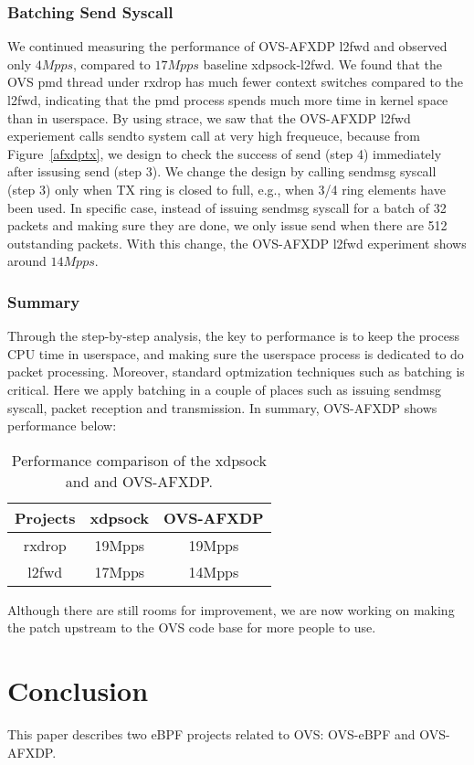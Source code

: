 \documentclass[10pt]{sigplanconf}
\begin{document}
\subsubsection{Batching Send Syscall}
We continued measuring the performance of OVS-AFXDP l2fwd and
observed only $4Mpps$, compared to $17Mpps$ baseline xdpsock-l2fwd.
We found that the OVS pmd thread under rxdrop
has much fewer context switches compared to the l2fwd, indicating that
the pmd process spends much more time in kernel space than in userspace.
By using strace, we saw that the OVS-AFXDP l2fwd experiement calls sendto system call
at very high frequeuce, because from Figure~\ref{afxdptx}, we design to check
the success of send (step 4) immediately after issusing send (step 3).
We change the design by calling sendmsg syscall (step 3) only when TX ring is
closed to full, e.g., when 3/4 ring elements have been used.
In specific case, instead of issuing sendmsg syscall for a batch of 32 packets
and making sure they are done, we only issue send when there are 512 outstanding
packets.  With this change, the OVS-AFXDP l2fwd experiment shows around $14Mpps$.

\subsubsection{Summary}
Through the step-by-step analysis, the key to performance is to keep
the process CPU time in userspace, and making sure the userspace process
is dedicated to do packet processing. Moreover, standard optmization
techniques such as batching is critical. Here we apply batching in a
couple of places such as issuing sendmsg syscall, packet reception and
transmission. In summary, OVS-AFXDP shows performance below:
\begin{table}
\centering
\small
\begin{tabular}{|c | c | c|}
\hline
 {\bf Projects} & {\bf xdpsock } & {\bf OVS-AFXDP} \\ \hline\hline
  rxdrop & 19Mpps & 19Mpps \\ \hline
  l2fwd  & 17Mpps & 14Mpps \\ \hline
  \end{tabular}
\caption{\footnotesize
Performance comparison of the xdpsock and and OVS-AFXDP.
}
\label{compare}
\end{table}

Although there are still rooms for improvement, we are now working on
making the patch upstream to the OVS code base for more people to use.

\section{Conclusion}
\label{sec:conclusion}
This paper describes two eBPF projects related to OVS: OVS-eBPF and OVS-AFXDP.



\end{document}

